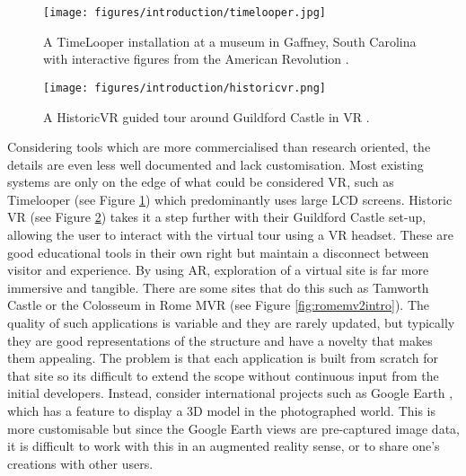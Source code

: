 \documentclass[12pt, a4paper]{article}
\begin{document}
\begin{figure}
    \centering
    \texttt{[image: figures/introduction/timelooper.jpg]}
    \caption{A TimeLooper installation at a museum in Gaffney, South Carolina with interactive figures from the American Revolution \cite{existing:timelooper}.}
    \label{fig:timelooper}
\end{figure}

\begin{figure}
    \centering
    \texttt{[image: figures/introduction/historicvr.png]}
    \caption{A HistoricVR guided tour around Guildford Castle in VR \cite{existing:historicvr}.}
    \label{fig:historicvr}
\end{figure}

Considering tools which are more commercialised than research oriented, the details are even less well documented and lack customisation. Most existing systems are only on the edge of what could be considered VR, such as Timelooper \cite{existing:timelooper} (see Figure \ref{fig:timelooper}) which predominantly uses large LCD screens. Historic VR \cite{existing:historicvr} (see Figure \ref{fig:historicvr}) takes it a step further with their Guildford Castle set-up, allowing the user to interact with the virtual tour using a VR headset. These are good educational tools in their own right but maintain a disconnect between visitor and experience. By using AR, exploration of a virtual site is far more immersive and tangible. There are some sites that do this such as Tamworth Castle \cite{existing:tamworth} or the Colosseum in Rome MVR \cite{existing:romemvr} (see Figure \ref{fig:romemv2intro}). The quality of such applications is variable and they are rarely updated, but typically they are good representations of the structure and have a novelty that makes them appealing. The problem is that each application is built from scratch for that site so its difficult to extend the scope without continuous input from the initial developers. Instead, consider international projects such as Google Earth \cite{existing:googleearth}, which has a feature to display a 3D model in the photographed world. This is more customisable but since the Google Earth views are pre-captured image data, it is difficult to work with this in an augmented reality sense, or to share one's creations with other users.
\end{document}
